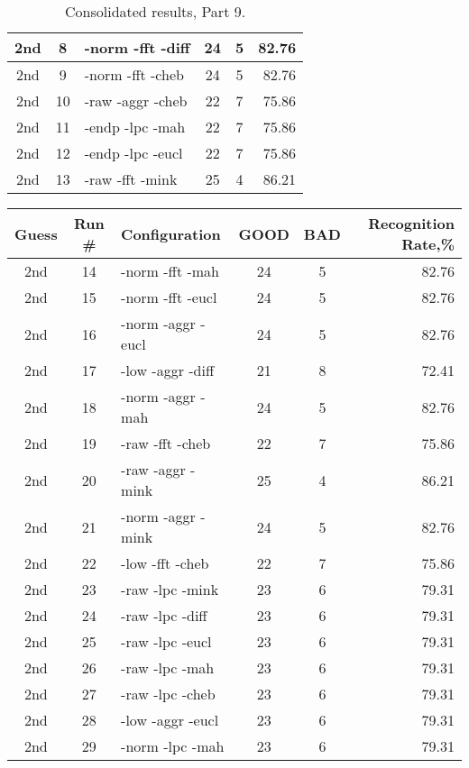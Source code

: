 \begin{table}
\begin{minipage}[b]{\textwidth}
\begin{tabular}{|c|c|l|c|c|r|}
2nd & 8 & -norm -fft -diff  & 24 & 5 & 82.76\\ \hline
2nd & 9 & -norm -fft -cheb  & 24 & 5 & 82.76\\ \hline
2nd & 10 & -raw -aggr -cheb  & 22 & 7 & 75.86\\ \hline
2nd & 11 & -endp -lpc -mah  & 22 & 7 & 75.86\\ \hline
2nd & 12 & -endp -lpc -eucl  & 22 & 7 & 75.86\\ \hline
2nd & 13 & -raw -fft -mink  & 25 & 4 & 86.21\\ \hline
\end{tabular}
\end{minipage}
\caption{Consolidated results, Part 9.}
\label{tab:results9}
\end{table}

\begin{table}
\begin{minipage}[b]{\textwidth}
\centering
\begin{tabular}{|c|c|l|c|c|r|} \hline
Guess & Run \# & Configuration & GOOD & BAD & Recognition Rate,\%\\ \hline\hline
2nd & 14 & -norm -fft -mah  & 24 & 5 & 82.76\\ \hline
2nd & 15 & -norm -fft -eucl  & 24 & 5 & 82.76\\ \hline
2nd & 16 & -norm -aggr -eucl  & 24 & 5 & 82.76\\ \hline
2nd & 17 & -low -aggr -diff  & 21 & 8 & 72.41\\ \hline
2nd & 18 & -norm -aggr -mah  & 24 & 5 & 82.76\\ \hline
2nd & 19 & -raw -fft -cheb  & 22 & 7 & 75.86\\ \hline
2nd & 20 & -raw -aggr -mink  & 25 & 4 & 86.21\\ \hline
2nd & 21 & -norm -aggr -mink  & 24 & 5 & 82.76\\ \hline
2nd & 22 & -low -fft -cheb  & 22 & 7 & 75.86\\ \hline
2nd & 23 & -raw -lpc -mink  & 23 & 6 & 79.31\\ \hline
2nd & 24 & -raw -lpc -diff  & 23 & 6 & 79.31\\ \hline
2nd & 25 & -raw -lpc -eucl  & 23 & 6 & 79.31\\ \hline
2nd & 26 & -raw -lpc -mah  & 23 & 6 & 79.31\\ \hline
2nd & 27 & -raw -lpc -cheb  & 23 & 6 & 79.31\\ \hline
2nd & 28 & -low -aggr -eucl  & 23 & 6 & 79.31\\ \hline
2nd & 29 & -norm -lpc -mah  & 23 & 6 & 79.31\\ \hline

\end{tabular}
\end{minipage}
\end{table}
